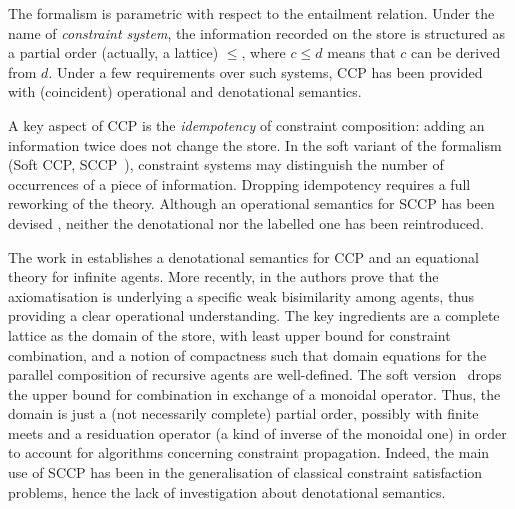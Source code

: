 \documentclass[submission,copyright,creativecommons]{eptcs}
\begin{document}
The formalism is parametric with respect to the entailment relation. Under the name of \emph{constraint system}, 
the information recorded on the store is structured as a partial order (actually, a lattice) $\leq$, where $c\leq d$ means that $c$ can be derived from $d$.
%
Under a few requirements over such systems, CCP has been provided with (coincident) operational and denotational semantics. 



A key aspect of CCP is the \emph{idempotency} of constraint composition:
adding an information twice does not change the store. 
%
In the soft variant of the formalism (Soft CCP, SCCP~\cite{scc}),
constraint systems may distinguish the number of occurrences of a  
piece of information.
%
Dropping idempotency requires a full reworking of the theory. Although an operational semantics for SCCP has been devised \cite{scc},
neither the denotational nor the labelled one has been reintroduced. 




The work in \cite{popl91} establishes a denotational semantics
for CCP and an equational theory for infinite agents. More recently, in \cite{pippo} the authors
prove that the axiomatisation is underlying a specific weak bisimilarity among agents,
thus providing a clear operational understanding.
%
The key ingredients are a complete lattice as the domain of the store, with least upper bound for constraint
combination, and a notion of compactness such that domain equations for 
the parallel composition of 
recursive agents are well-defined.
%
The soft version~\cite{scc} drops the upper bound for combination
in exchange of a monoidal operator. Thus, the domain is just a (not
necessarily complete) partial order, possibly with finite meets and a residuation operator (a kind of
inverse of the monoidal one) in order to account for algorithms concerning constraint propagation.
%
Indeed, the main use of SCCP has been in the generalisation of classical constraint satisfaction
problems, hence 
the lack of investigation about denotational semantics.
\end{document}
